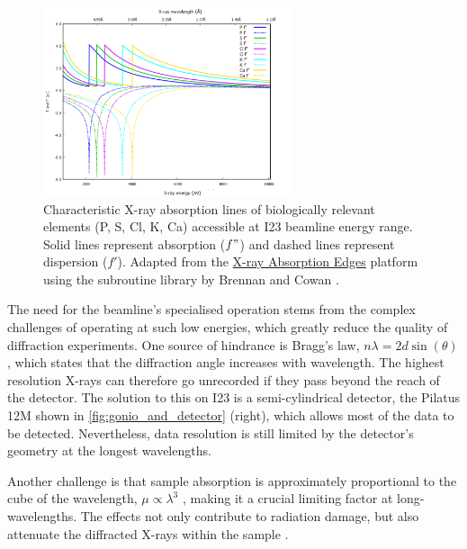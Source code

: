 \begin{figure}[h]
    \centering
    \includegraphics[width = 0.65\textwidth]{images/absorption lines high quality cropped.png}
    \caption{Characteristic X-ray absorption lines of biologically relevant elements (P, S, Cl, K, Ca) accessible at I23 beamline energy range. Solid lines represent absorption ($f"$) and dashed lines represent dispersion ($f'$). Adapted from the \href{http://skuld.bmsc.washington.edu/scatter/AS_periodic.html}{X-ray Absorption Edges} platform using the subroutine library by Brennan and Cowan \cite{Brennan1992}.}%
    \label{Anomaluos scattering edges}
\end{figure}

The need for the beamline's specialised operation stems from the complex challenges of operating at such low energies, which greatly reduce the quality of diffraction experiments.
One source of hindrance is Bragg’s law, $nλ = 2d \sin(\theta)$, which states that the diffraction angle increases with wavelength. The highest resolution X-rays can therefore go unrecorded if they pass beyond the reach of the detector. The solution to this on I23 is a semi-cylindrical detector, the Pilatus 12M shown in \cref{fig:gonio_and_detector} (right), which allows most of the data to be detected. Nevertheless, data resolution is still limited by the detector’s geometry at the longest wavelengths.

 Another challenge is that sample absorption is approximately proportional to the cube of the wavelength, $\mu \propto \lambda^3$ \cite{Arndt1984}, making it a crucial limiting factor at long-wavelengths. The effects not only contribute to radiation damage, but also attenuate the diffracted X-rays within the sample \cite{Wagner2016}.

